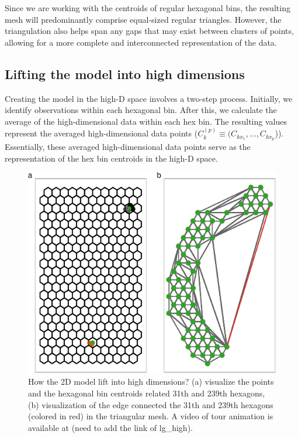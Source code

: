 \documentclass[
  12pt]{article}
\begin{document}
Since we are working with the centroids of regular hexagonal bins, the
resulting mesh will predominantly comprise equal-sized regular
triangles. However, the triangulation also helps span any gaps that may
exist between clusters of points, allowing for a more complete and
interconnected representation of the data.

\hypertarget{lifting-the-model-into-high-dimensions}{%
\subsection{Lifting the model into high
dimensions}\label{lifting-the-model-into-high-dimensions}}

Creating the model in the high-D space involves a two-step process.
Initially, we identify observations within each hexagonal bin. After
this, we calculate the average of the high-dimensional data within each
hex bin. The resulting values represent the averaged high-dimensional
data points (\(C_k^{(p)} \equiv (C_{kx_1}, ..., C_{kx_p}\))).
Essentially, these averaged high-dimensional data points serve as the
representation of the hex bin centroids in the high-D space.

\begin{figure}

{\centering \includegraphics{paper_files/figure-pdf/fig-wkhighD-1.pdf}

}

\caption{\label{fig-wkhighD}How the 2D model lift into high dimensions?
(a) visualize the points and the hexagonal bin centroids related 31th
and 239th hexagons, (b) visualization of the edge connected the 31th and
239th hexagons (colored in red) in the triangular mesh. A video of tour
animation is available at (need to add the link of lg\_high).}

\end{figure}
\end{document}
